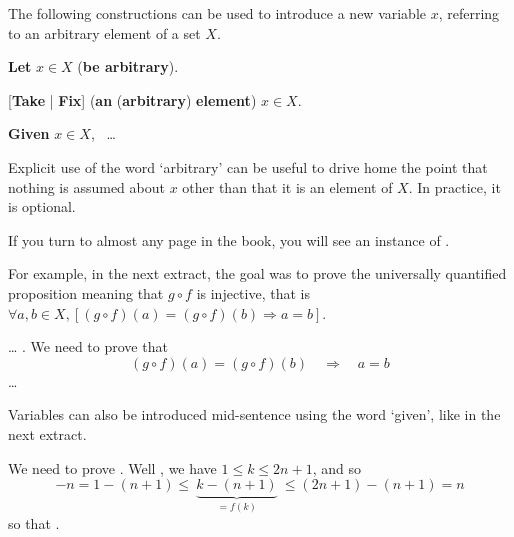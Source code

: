 \begin{vocabulary}
\label{vcbIntroducingVariable}
The following constructions can be used to introduce a new variable $x$, referring to an arbitrary element of a set $X$.

\begin{vocabtemplate}
\textbf{Let} $x \in X$ (\textbf{be arbitrary}).

\vtor

[\textbf{Take} | \textbf{Fix}] (\textbf{an} (\textbf{arbitrary}) \textbf{element}) $x \in X$.

\vtor

\textbf{Given} $x \in X$, ~\dots{}
\end{vocabtemplate}

Explicit use of the word `arbitrary' can be useful to drive home the point that nothing is assumed about $x$ other than that it is an element of $X$. In practice, it is optional.
\end{vocabulary}

If you turn to almost any page in the book, you will see an instance of .

For example, in the next extract, the goal was to prove the universally quantified proposition meaning that $g \circ f$ is injective, that is $\forall a,b \in X,[(g \circ f)(a) = (g \circ f)(b) \Rightarrow a=b]$.

\begin{extract}
\label{xtrVariableIntroductionExample}
\dots{} .
We need to prove that
\[ (g \circ f)(a) = (g \circ f)(b) \quad \Rightarrow \quad a=b \]
\dots{}
\end{extract}

Variables can also be introduced mid-sentence using the word `given', like in the next extract.

\begin{extract}
\label{xtrIntroducingVariableExampleTwo}
We need to prove . Well , we have $1 \le k \le 2n+1$, and so
\[ -n = 1-(n+1) \le ~ \underbrace{k-(n+1)}_{=f(k)} ~  \le (2n+1) - (n+1) = n \]
so that .
\end{extract}

